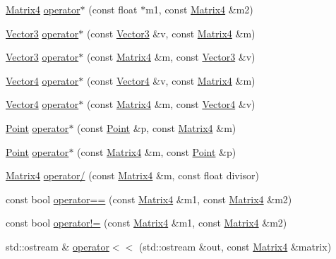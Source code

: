 \begin{DoxyCompactItemize}
\item 
\hyperlink{classprism_1_1_matrix4}{Matrix4} \hyperlink{classprism_1_1_matrix4_a26ce7e4aed9bc5780ebb8411acce6583}{operator$\ast$} (const float $\ast$m1, const \hyperlink{classprism_1_1_matrix4}{Matrix4} \&m2)
\item 
\hyperlink{classprism_1_1_vector3}{Vector3} \hyperlink{classprism_1_1_matrix4_ada37b2462427325427c6503a1a370d40}{operator$\ast$} (const \hyperlink{classprism_1_1_vector3}{Vector3} \&v, const \hyperlink{classprism_1_1_matrix4}{Matrix4} \&m)
\item 
\hyperlink{classprism_1_1_vector3}{Vector3} \hyperlink{classprism_1_1_matrix4_acb4d5cf5c35ead4ac8d2713d32a3bb53}{operator$\ast$} (const \hyperlink{classprism_1_1_matrix4}{Matrix4} \&m, const \hyperlink{classprism_1_1_vector3}{Vector3} \&v)
\item 
\hyperlink{classprism_1_1_vector4}{Vector4} \hyperlink{classprism_1_1_matrix4_a8f72f1280f8f44f2f85c32e930ef95f1}{operator$\ast$} (const \hyperlink{classprism_1_1_vector4}{Vector4} \&v, const \hyperlink{classprism_1_1_matrix4}{Matrix4} \&m)
\item 
\hyperlink{classprism_1_1_vector4}{Vector4} \hyperlink{classprism_1_1_matrix4_a20a9788aba6ec37d10a0c04fa479b26e}{operator$\ast$} (const \hyperlink{classprism_1_1_matrix4}{Matrix4} \&m, const \hyperlink{classprism_1_1_vector4}{Vector4} \&v)
\item 
\hyperlink{classprism_1_1_point}{Point} \hyperlink{classprism_1_1_matrix4_a00876fb2e95ed93d05c590a941d2c3a3}{operator$\ast$} (const \hyperlink{classprism_1_1_point}{Point} \&p, const \hyperlink{classprism_1_1_matrix4}{Matrix4} \&m)
\item 
\hyperlink{classprism_1_1_point}{Point} \hyperlink{classprism_1_1_matrix4_a67263983148d3a3593ebc84eae31c87a}{operator$\ast$} (const \hyperlink{classprism_1_1_matrix4}{Matrix4} \&m, const \hyperlink{classprism_1_1_point}{Point} \&p)
\item 
\hyperlink{classprism_1_1_matrix4}{Matrix4} \hyperlink{classprism_1_1_matrix4_a9370aa111e71140fdd85f3e055a26cbd}{operator/} (const \hyperlink{classprism_1_1_matrix4}{Matrix4} \&m, const float divisor)
\item 
const bool \hyperlink{classprism_1_1_matrix4_a0cbf3c575d1951cc9ae4dfe79c3a3729}{operator==} (const \hyperlink{classprism_1_1_matrix4}{Matrix4} \&m1, const \hyperlink{classprism_1_1_matrix4}{Matrix4} \&m2)
\item 
const bool \hyperlink{classprism_1_1_matrix4_aaedc2ff7fd572ebc03eec59fb11cd5a9}{operator!=} (const \hyperlink{classprism_1_1_matrix4}{Matrix4} \&m1, const \hyperlink{classprism_1_1_matrix4}{Matrix4} \&m2)
\item 
std\+::ostream \& \hyperlink{classprism_1_1_matrix4_a4ccbb04098ce491412da339e07eb72d7}{operator$<$$<$} (std\+::ostream \&out, const \hyperlink{classprism_1_1_matrix4}{Matrix4} \&matrix)
\end{DoxyCompactItemize}


